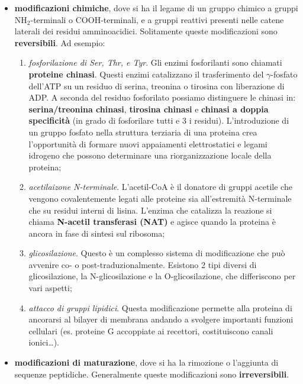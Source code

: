\documentclass[11pt]{book}
\begin{document}
\begin{itemize}
\itemsep1pt\parskip0pt
\item
  \textbf{modificazioni chimiche}, dove si ha il legame di un gruppo
  chimico a gruppi NH\(_2\)-terminali o COOH-terminali, e a gruppi
  reattivi presenti nelle catene laterali dei residui amminoacidici.
  Solitamente queste modificazioni sono \textbf{reversibili}. Ad
  esempio:

  \begin{enumerate}
  \def\labelenumi{\arabic{enumi}.}
  \itemsep1pt\parskip0pt
  \item
    \emph{fosforilazione di Ser, Thr, e Tyr}. Gli enzimi fosforilanti
    sono chiamati \textbf{proteine chinasi}. Questi enzimi catalizzano
    il trasferimento del \(\gamma\)-fosfato dell'ATP su un residuo di
    serina, treonina o tirosina con liberazione di ADP. A seconda del
    residuo fosforilato possiamo distinguere le chinasi in:
    \textbf{serina/treonina chinasi}, \textbf{tirosina chinasi} e
    \textbf{chinasi a doppia specificità} (in grado di fosforilare tutti
    e 3 i residui). L'introduzione di un gruppo fosfato nella struttura
    terziaria di una proteina crea l'opportunità di formare nuovi
    appaiamenti elettrostatici e legami idrogeno che possono determinare
    una riorganizzazione locale della proteina;
  \item
    \emph{acetilaizone N-terminale}. L'acetil-CoA è il donatore di
    gruppi acetile che vengono covalentemente legati alle proteine sia
    all'estremità N-terminale che su residui interni di lisina. L'enzima
    che catalizza la reazione si chiama \textbf{N-acetil transferasi
    (NAT)} e agisce quando la proteina è ancora in fase di sintesi sul
    ribosoma;
  \item
    \emph{glicosilazione}. Questo è un complesso sistema di
    modificazione che può avvenire co- o post-traduzionalmente. Esistono
    2 tipi diversi di glicosilazione, la N-glicosilazione e la
    O-glicosilazione, che differiscono per vari aspetti;
  \item
    \emph{attacco di gruppi lipidici}. Questa modificazione permette
    alla proteina di ancorarsi al bilayer di membrana andando a svolgere
    importanti funzioni cellulari (es. proteine G accoppiate ai
    recettori, costituiscono canali ionici\ldots{}).
  \end{enumerate}
\item
  \textbf{modificazioni di maturazione}, dove si ha la rimozione o
  l'aggiunta di sequenze peptidiche. Generalmente queste modificazioni
  sono \textbf{irreversibili}.


\end{itemize}
\end{document}
